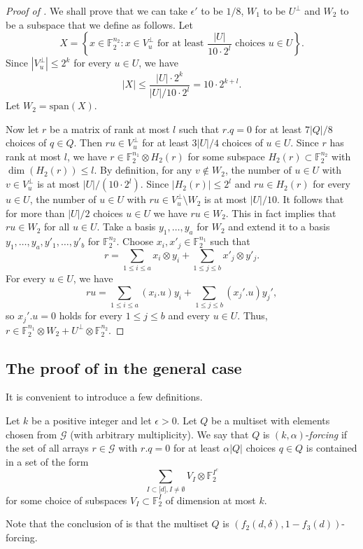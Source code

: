 \documentclass{toc}
\newcommand\eps{\epsilon}  %
\newcommand\F{\mathbb{F}}
\renewcommand\a{\alpha}
\renewcommand\d{\delta}
\newcommand \cG{\mathcal G}
\newcommand \s{\subset}
\begin{document}
\begin{proof}[Proof of ]
  We shall prove that we can take $\eps'$ to be $1/8$, $W_1$ to be $U^{\perp}$ and $W_2$ to be a subspace that we define as follows. Let
  \[
    X=\left\{x\in \F_2^{n_2}: x\in V_u^{\perp} \text{ for at least } \frac{|U|}{10\cdot 2^{l}} \text{ choices } u\in U\right\}.
  \]
  Since $|V_u^{\perp}|\leq 2^k$ for every $u\in U$, we have
  \[
    |X|\leq \frac{|U|\cdot 2^k}{{|U|}/{10\cdot 2^l}}=10\cdot
    2^{k+l}.
  \]
  Let $W_2=\text{span}(X)$.
	
  Now let $r$ be a matrix of rank at most $l$ such that $r.q=0$ for at least $7|Q|/8$ choices of $q\in Q$. Then $ru\in V_u^{\perp}$ for at least $3|U|/4$ choices of $u\in U$. Since $r$ has rank at most $l$, we have $r\in \mathbb{F}_2^{n_1}\otimes H_2(r)$ for some subspace $H_2(r)\s \F_2^{n_2}$ with $\dim(H_2(r))\leq l$. By definition, for any $v\not \in W_2$, the number of $u\in U$ with $v\in V_u^{\perp}$ is at most ${|U|}/{(10\cdot 2^l)}$. Since $|H_2(r)|\leq 2^l$ and $ru\in H_2(r)$ for every $u\in U$, the number of $u\in U$ with $ru\in V_u^{\perp}\setminus W_2$ is at most ${|U|}/{10}$. It follows that for more than $|U|/2$ choices $u\in U$ we have $ru\in W_2$. This in fact implies that $ru\in W_2$ for all $u\in U$. Take a basis $y_1,\dots,y_a$ for $W_2$ and extend it to a basis $y_1,\dots,y_a,y'_1,\dots,y'_b$ for $\F_2^{n_2}$. Choose $x_i,x'_j\in \F_2^{n_1}$ such that
  \[
    r=\sum_{1\leq i\leq a} x_i\otimes y_i+\sum_{1\leq j\leq b} x'_j\otimes y'_j.
  \]
  For every $u\in U$, we have
  \[
    ru=\sum_{1\leq i\leq a} (x_i.u)y_i+\sum_{1\leq j\leq b}
    (x_j'.u)y_j',
  \]
  so $x_j'.u=0$ holds for every $1\leq j\leq b$ and every $u\in
  U$. Thus, $r\in \F_2^{n_1}\otimes W_2+U^{\perp}\otimes \F_2^{n_2}$.
\end{proof}

\subsection{The proof of  in the general case}

It is convenient to introduce a few definitions.

\begin{definition}
  Let $k$ be a positive integer and let $\eps>0$. Let $Q$ be a multiset with elements chosen from $\cG$ (with arbitrary multiplicity). We say that $Q$ is $(k,\a)$-\emph{forcing} if the set of all arrays $r\in \cG$ with $r.q=0$ for at least $\a|Q|$ choices $q\in Q$ is contained in a set of the form
  \[
    \sum_{I\subset \lbrack d\rbrack,I\neq \emptyset} V_I\otimes \F_2^{I^c}
  \]
  for some choice of subspaces $V_I\s \F_2^{I}$ of dimension at most
  $k$.
\end{definition}
Note that the conclusion of  is that the multiset $Q$ is $(f_2(d,\d),1-f_3(d))$-forcing.
\end{document}
